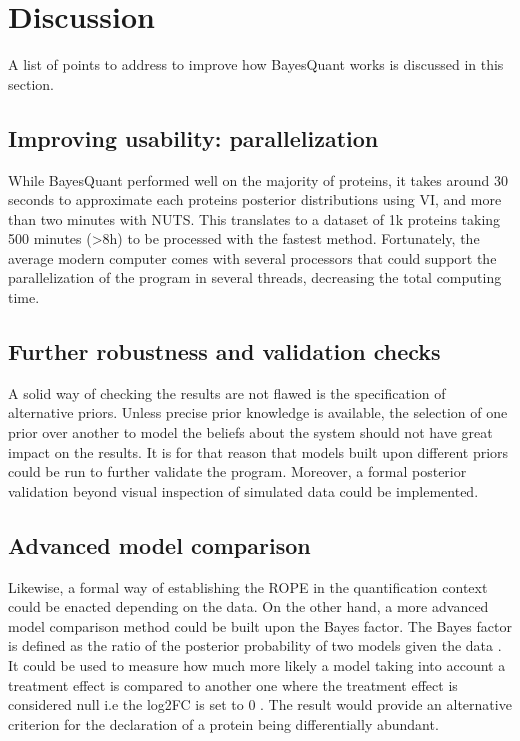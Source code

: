 \section{Discussion}

A list of points to address to improve how BayesQuant works is discussed in this section.

\subsection{Improving usability: parallelization}

While BayesQuant performed well on the majority of proteins, it takes around 30 seconds to approximate each protein\textquotesingle s posterior distributions using \ac{VI}, and more than two minutes with \ac{NUTS}. This translates to a dataset of 1k proteins taking 500 minutes (>8h) to be processed with the fastest method. Fortunately, the average modern computer comes with several processors that could support the parallelization of the program in several threads, decreasing the total computing time.

\subsection{Further robustness and validation checks}

A solid way of checking the results are not flawed is the specification of alternative priors. Unless precise prior knowledge is available, the selection of one prior over another to model the beliefs about the system should not have great impact on the results. It is for that reason that models built upon different priors could be run to further validate the program. Moreover, a formal posterior validation beyond visual inspection of simulated data could be implemented.


\subsection{Advanced model comparison}

Likewise, a formal way of establishing the \ac{ROPE} in the quantification context could be enacted depending on the data. On the other hand, a more advanced model comparison method could be built upon the Bayes factor. The Bayes factor is defined as the ratio of the posterior probability of two models given the data \cite{Kruschke}. It could be used to measure how much more likely a model taking into account a treatment effect is compared to another one where the treatment effect is considered null i.e the \ac{log2FC} is set to 0 \cite{Goodman1999}. The result would provide an alternative criterion for the declaration of a protein being differentially abundant.

